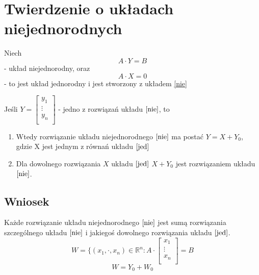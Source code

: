 \documentclass[11pt]{article}
\begin{document}
\section{Twierdzenie o układach niejednorodnych}
Niech \begin{equation}A \cdot Y = B \label{nie} \end{equation} - układ niejednorodny, oraz \begin{equation}A \cdot X = 0 \label{jed} \end{equation} - to jest układ jednorodny i jest stworzony z układem \eqref{nie}

Jeśli $ Y = \begin{bmatrix}
	y_1\\
	\vdots\\
	y_n\\
\end{bmatrix}$ - jedno z rozwiązań układu $\eqref{nie}$, to
\begin{enumerate}
\item{Wtedy rozwiązanie układu niejednorodnego $\eqref{nie}$ ma postać $Y = X + Y_{0}$, gdzie X jest jednym z równań układu $\eqref{jed}$}
\item{Dla dowolnego rozwiązania $X$ układu $\eqref{jed}$ $X+Y_{0}$ jest rozwiązaniem układu $\eqref{nie}$.}
\end{enumerate}

\subsection{Wniosek}
Każde rozwiązanie układu niejednorodnego $\eqref{nie}$ jest sumą rozwiązania szczególnego układu $\eqref{nie}$ i jakiegoś dowolnego rozwiązania układu $\eqref{jed}$.
$$ W = \{ (x_1, \cdot , x_n) \in \mathbb{R}^n :  A \cdot \begin{bmatrix}
	x_1\\
	\vdots\\
	x_n\\
\end{bmatrix} = B$$
$$W = Y_0 + W_0$$
\end{document}
